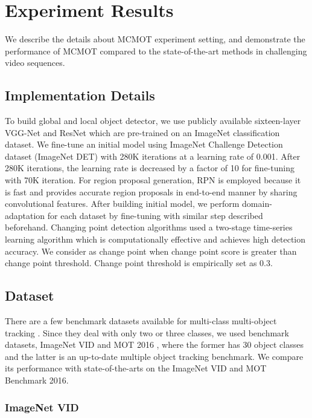 \documentclass[runningheads]{llncs}
\begin{document}
\section{Experiment Results}

We describe the details about MCMOT experiment setting, and demonstrate the performance of MCMOT compared to the state-of-the-art methods in challenging video sequences.

\subsection{Implementation Details}

To build global and local object detector, we use publicly available sixteen-layer VGG-Net \cite{Ref19} and ResNet \cite{Ref29} which are pre-trained on an ImageNet classification dataset. We fine-tune an initial model using ImageNet Challenge Detection dataset (ImageNet DET) with 280K iterations at a learning rate of 0.001. After 280K iterations, the learning rate is decreased by a factor of 10 for fine-tuning with 70K iteration. For region proposal generation, RPN \cite{Ref28} is employed because it is fast and provides accurate region proposals in end-to-end manner by sharing convolutional features. After building initial model, we perform domain-adaptation for each dataset by fine-tuning with similar step described beforehand. Changing point detection algorithms used a two-stage time-series learning algorithm \cite{Ref24} which is computationally effective and achieves high detection accuracy. We consider as change point when change point score is greater than change point threshold. Change point threshold is empirically set as 0.3. 

\subsection{Dataset}

There are a few benchmark datasets available for multi-class multi-object tracking \cite{Ref43}. Since they deal with only two or three classes, we used benchmark datasets, ImageNet VID \cite{Ref31} and MOT 2016 \cite{Ref32}, where the former has 30 object classes and the latter is an up-to-date multiple object tracking benchmark. We compare its performance with state-of-the-arts on the ImageNet VID and MOT Benchmark 2016.

\subsubsection{ImageNet VID}
\end{document}
